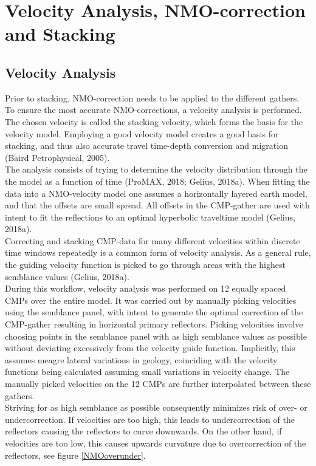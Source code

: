 \documentclass[10pt,a4paper]{article}
\begin{document}
\section{Velocity Analysis, NMO-correction and Stacking}

\subsection{Velocity Analysis}

Prior to stacking, NMO-correction needs to be applied to the different gathers. To ensure the most accurate NMO-corrections, a velocity analysis is performed. The chosen velocity is called the stacking velocity, which forms the basis for the velocity model. Employing a good velocity model creates a good basis for stacking, and thus also accurate travel time-depth conversion and migration (Baird Petrophysical, 2005).
\\
The analysis consists of trying to determine the velocity distribution through the the model as a function of time (ProMAX, 2018; Gelius, 2018a). When fitting the data into a NMO-velocity model one assumes a horizontally layered earth model, and that the offsets are small spread. All offsets in the CMP-gather are used with intent to fit the reflections to an optimal hyperbolic traveltime model (Gelius, 2018a). 
\\
Correcting and stacking CMP-data for many different velocities within discrete time windows repeatedly is a common form of velocity analysis. As a general rule, the guiding velocity function is picked to go through areas with the highest semblance values (Gelius, 2018a).
\\
During this workflow, velocity analysis was performed on 12 equally spaced CMPs over the entire model. It was carried out by manually picking velocities using the semblance panel, with intent to generate the optimal correction of the CMP-gather resulting in horizontal primary reflectors. Picking velocities involve choosing points in the semblance panel with as high semblance values as possible without deviating excessively from the velocity guide function. Implicitly, this assumes meagre lateral variations in geology, coinciding with the velocity functions being calculated assuming small variations in velocity change. The manually picked velocities on the 12 CMPs are further interpolated between these gathers.
\\
Striving for as high semblance as possible consequently minimizes risk of over- or undercorrection. If velocities are too high, this leads to undercorrection of the reflectors causing the reflectors to curve downwards. On the other hand, if velocities are too low, this causes upwards curvature due to overcorrection of the reflectors, see figure \ref{NMOoverunder}.
\end{document}
